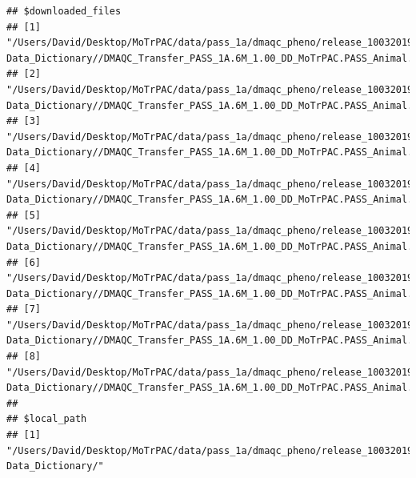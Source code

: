 \documentclass[]{article}
\begin{document}
\begin{verbatim}
## $downloaded_files
## [1] "/Users/David/Desktop/MoTrPAC/data/pass_1a/dmaqc_pheno/release_10032019/1-Data_Dictionary//DMAQC_Transfer_PASS_1A.6M_1.00_DD_MoTrPAC.PASS_Animal.Acute.Test.csv"          
## [2] "/Users/David/Desktop/MoTrPAC/data/pass_1a/dmaqc_pheno/release_10032019/1-Data_Dictionary//DMAQC_Transfer_PASS_1A.6M_1.00_DD_MoTrPAC.PASS_Animal.BICLabelData.csv"        
## [3] "/Users/David/Desktop/MoTrPAC/data/pass_1a/dmaqc_pheno/release_10032019/1-Data_Dictionary//DMAQC_Transfer_PASS_1A.6M_1.00_DD_MoTrPAC.PASS_Animal.Calculated.Variables.csv"
## [4] "/Users/David/Desktop/MoTrPAC/data/pass_1a/dmaqc_pheno/release_10032019/1-Data_Dictionary//DMAQC_Transfer_PASS_1A.6M_1.00_DD_MoTrPAC.PASS_Animal.Familiarization.csv"     
## [5] "/Users/David/Desktop/MoTrPAC/data/pass_1a/dmaqc_pheno/release_10032019/1-Data_Dictionary//DMAQC_Transfer_PASS_1A.6M_1.00_DD_MoTrPAC.PASS_Animal.Key.csv"                 
## [6] "/Users/David/Desktop/MoTrPAC/data/pass_1a/dmaqc_pheno/release_10032019/1-Data_Dictionary//DMAQC_Transfer_PASS_1A.6M_1.00_DD_MoTrPAC.PASS_Animal.Registration.csv"        
## [7] "/Users/David/Desktop/MoTrPAC/data/pass_1a/dmaqc_pheno/release_10032019/1-Data_Dictionary//DMAQC_Transfer_PASS_1A.6M_1.00_DD_MoTrPAC.PASS_Animal.Specimen.Collection.csv" 
## [8] "/Users/David/Desktop/MoTrPAC/data/pass_1a/dmaqc_pheno/release_10032019/1-Data_Dictionary//DMAQC_Transfer_PASS_1A.6M_1.00_DD_MoTrPAC.PASS_Animal.Specimen.Processing.csv" 
## 
## $local_path
## [1] "/Users/David/Desktop/MoTrPAC/data/pass_1a/dmaqc_pheno/release_10032019/1-Data_Dictionary/"
\end{verbatim}
\end{document}
